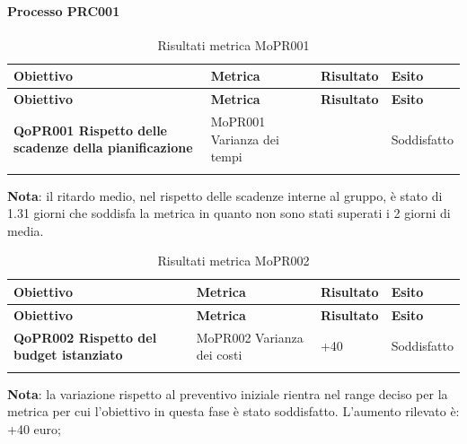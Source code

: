 \documentclass[../piano-di-qualifica.tex]{subfiles}
\begin{document}
\paragraph{Processo PRC001}
\label{sub:processo_PRC001}

\renewcommand{\arraystretch}{2} %
\begin{longtable}[H]{>{\centering\bfseries}m{5cm} >{\centering}m{5cm} >{\centering}m{2.5cm} >{\centering\arraybackslash}m{2.5cm}}  
  \rowcolor{lightgray}
  {\textbf{Obiettivo}} & {\textbf{Metrica}} & {\textbf{Risultato}} & {\textbf{Esito}}  \\
  \endfirsthead%
  \rowcolor{lightgray}
  {\textbf{Obiettivo}} & {\textbf{Metrica}} & {\textbf{Risultato}} & {\textbf{Esito}}  \\
  \endhead%
  \textbf{QoPR001 Rispetto delle scadenze della pianificazione} & MoPR001 Varianza dei tempi & 1.31 & Soddisfatto \\
  \caption{Risultati metrica MoPR001}
  \label{tab:my-table}
\end{longtable}
\textbf{Nota}: il ritardo medio, nel rispetto delle scadenze interne al gruppo, è stato di 1.31 giorni che soddisfa la metrica in quanto non sono stati superati i 2 giorni di media.

\renewcommand{\arraystretch}{2} %
\begin{longtable}[H]{>{\centering\bfseries}m{5cm} >{\centering}m{5cm} >{\centering}m{2.5cm} >{\centering\arraybackslash}m{2.5cm}}  
  \rowcolor{lightgray}
  {\textbf{Obiettivo}} & {\textbf{Metrica}} & {\textbf{Risultato}} & {\textbf{Esito}}  \\
  \endfirsthead%
  \rowcolor{lightgray}
  {\textbf{Obiettivo}} & {\textbf{Metrica}} & {\textbf{Risultato}} & {\textbf{Esito}}  \\
  \endhead%
  \textbf{QoPR002 Rispetto del budget istanziato} & MoPR002 Varianza dei costi & +40 & Soddisfatto \\
  \caption{Risultati metrica MoPR002}
  \label{tab:my-table}
\end{longtable}
\textbf{Nota}: la variazione rispetto al preventivo iniziale rientra nel range deciso per la metrica per cui l'obiettivo in questa fase è stato soddisfatto. L'aumento rilevato è: +40 euro;
\end{document}

